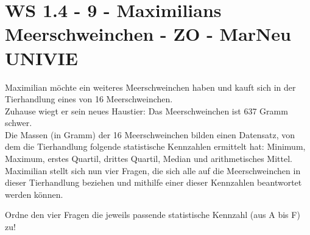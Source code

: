 \section{WS 1.4 - 9 - Maximilians Meerschweinchen - ZO - MarNeu UNIVIE}

\begin{beispiel}[WS 1.4]{1}
Maximilian möchte ein weiteres Meerschweinchen haben und kauft sich in der Tierhandlung eines von 16 Meerschweinchen. \\
Zuhause wiegt er sein neues Haustier: Das Meerschweinchen ist 637 Gramm schwer.\\
Die Massen (in Gramm) der 16 Meerschweinchen bilden einen Datensatz, von dem die Tierhandlung folgende statistische Kennzahlen ermittelt hat: Minimum, Maximum, erstes Quartil, drittes Quartil, Median und arithmetisches Mittel.\\
Maximilian stellt sich nun vier Fragen, die sich alle auf die Meerschweinchen in dieser Tierhandlung beziehen und mithilfe einer dieser Kennzahlen beantwortet werden können. 

Ordne den vier Fragen die jeweils passende statistische Kennzahl (aus A bis F) zu!

\end{beispiel}